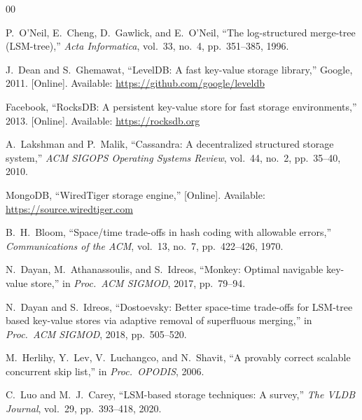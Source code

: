 \documentclass[conference]{IEEEtran}
\begin{document}
\begin{thebibliography}{00}

P.~O'Neil, E.~Cheng, D.~Gawlick, and E.~O'Neil, ``The log-structured merge-tree (LSM-tree),'' \textit{Acta Informatica}, vol.~33, no.~4, pp.~351--385, 1996.

J.~Dean and S.~Ghemawat, ``LevelDB: A fast key-value storage library,'' Google, 2011. [Online]. Available: \url{https://github.com/google/leveldb}

Facebook, ``RocksDB: A persistent key-value store for fast storage environments,'' 2013. [Online]. Available: \url{https://rocksdb.org}

A.~Lakshman and P.~Malik, ``Cassandra: A decentralized structured storage system,'' \textit{ACM SIGOPS Operating Systems Review}, vol.~44, no.~2, pp.~35--40, 2010.

MongoDB, ``WiredTiger storage engine,'' [Online]. Available: \url{https://source.wiredtiger.com}

B.~H.~Bloom, ``Space/time trade-offs in hash coding with allowable errors,'' \textit{Communications of the ACM}, vol.~13, no.~7, pp.~422--426, 1970.

N.~Dayan, M.~Athanassoulis, and S.~Idreos, ``Monkey: Optimal navigable key-value store,'' in \textit{Proc.\ ACM SIGMOD}, 2017, pp.~79--94.

N.~Dayan and S.~Idreos, ``Dostoevsky: Better space-time trade-offs for LSM-tree based key-value stores via adaptive removal of superfluous merging,'' in \textit{Proc.\ ACM SIGMOD}, 2018, pp.~505--520.

M.~Herlihy, Y.~Lev, V.~Luchangco, and N.~Shavit, ``A provably correct scalable concurrent skip list,'' in \textit{Proc.\ OPODIS}, 2006.

C.~Luo and M.~J.~Carey, ``LSM-based storage techniques: A survey,'' \textit{The VLDB Journal}, vol.~29, pp.~393--418, 2020.

\end{thebibliography}
\end{document}
